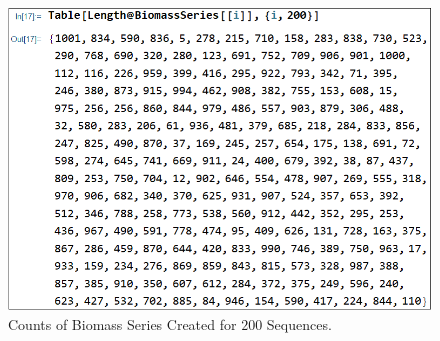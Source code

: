 \begin{landscape}
	\begin{figure}[ht]
		\centering
		\vspace*{1.5cm}
		\hspace*{-1cm}
		\includegraphics[width=1\textwidth]{../images/supplements-flux_vector_series_counts.png}
		\caption{Counts of Biomass Series Created for $200$ Sequences.}
		\label{figure-supplements-flux_vector_series_counts}
	\end{figure}
\end{landscape}